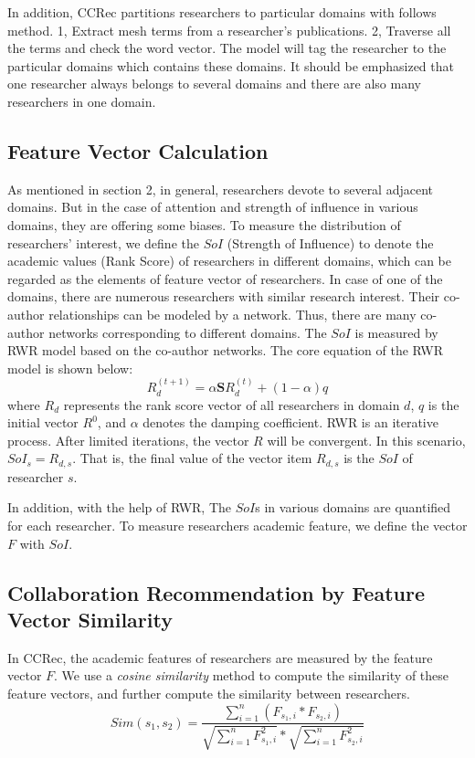 \documentclass{acm_proc_article-sp}
\begin{document}
In addition, CCRec partitions researchers to particular domains with follows method. 1, Extract mesh terms from a researcher's publications. 2, Traverse all the terms and check the word vector. The model will tag the researcher to the particular domains which contains these domains. It should be emphasized that one researcher always belongs to several domains and there are also many researchers in one domain.

\subsection{Feature Vector Calculation}
As mentioned in section 2, in general, researchers devote to several adjacent domains. But in the case of attention and strength of influence in various domains, they are offering some biases. To measure the distribution of researchers' interest, we define the $SoI$ (Strength of Influence) to denote the academic values (Rank Score) of researchers in different domains, which can be regarded as the elements of feature vector of researchers. In case of one of the domains, there are numerous researchers with similar research interest. Their co-author relationships can be modeled by a network. Thus, there are many co-author networks corresponding to different domains. The $SoI$ is measured by RWR model based on the co-author networks. The core equation of the RWR model is shown below:
\begin{equation}
R_{d}^{(t+1)}=\alpha \mathbf{S}R_{d}^{(t)}+(1-\alpha)q
\end{equation}
where $R_{d}$ represents the rank score vector of all researchers in domain $d$, $q$ is the initial vector $R^0$, and $\alpha$ denotes the damping coefficient. RWR is an iterative process. After limited iterations, the vector $R$ will be convergent. In this scenario, $SoI_{s}=R_{d,s}$. That is, the final value of the vector item $R_{d,s}$ is the $SoI$ of researcher $s$.

In addition, with the help of RWR, The $SoI$s in various domains are quantified for each researcher. To measure researchers academic feature, we define the vector $F$ with $SoI$.

\subsection{Collaboration Recommendation by Feature Vector Similarity}
In CCRec, the academic features of researchers are measured by the feature vector $F$. We use a \emph{cosine similarity} method to compute the similarity of these feature vectors, and further compute the similarity between researchers.
\begin{equation}
Sim(s_{1},s_{2})=\frac{\sum_{i=1}^{n}(F_{s_{1},i}*F_{s_{2},i})}{\sqrt{\sum_{i=1}^{n}F_{s_{1},i}^2}*\sqrt{\sum_{i=1}^{n}F_{s_{2},i}^2}}
\end{equation}
\end{document}
